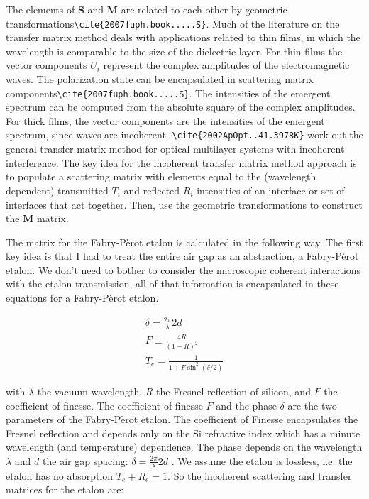 \documentclass[osajnl,preprint,showpacs,superscriptaddress,12pt]{revtex4-1} %
\begin{document}
The elements of $\boldsymbol{S}$ and $\boldsymbol{M}$ are related to each other by geometric transformations\verb|\cite{2007fuph.book.....S}|.  Much of the literature on the transfer matrix method deals with applications related to thin films, in which the wavelength is comparable to the size of the dielectric layer.  For thin films the vector components $U_{i}$ represent the complex amplitudes of the electromagnetic waves.  The polarization state can be encapsulated in scattering matrix components\verb|\cite{2007fuph.book.....S}|.  The intensities of the emergent spectrum can be computed from the absolute square of the complex amplitudes.  For thick films, the vector components are the intensities of the emergent spectrum, since waves are incoherent.  \verb|\cite{2002ApOpt..41.3978K}| work out the general transfer-matrix method for optical multilayer systems with incoherent interference.  The key idea for the incoherent transfer matrix method approach is to populate a scattering matrix with elements equal to the (wavelength dependent) transmitted $T_i$ and reflected $R_i$ intensities of an interface or set of interfaces that act together.  Then, use the geometric transformations to construct the $\boldsymbol{M}$ matrix.  

The matrix for the Fabry-P\`erot etalon is calculated in the following way.  The first key idea is that I had to treat the entire air gap as an abstraction, a Fabry-P\`erot etalon.  We don't need to bother to consider the microscopic coherent interactions with the etalon transmission, all of that information is encapsulated in these equations for a Fabry-P\`erot etalon.

\begin{eqnarray}
 \delta = \frac{2\pi}{\lambda}2d \\
  F \equiv \frac{4R}{(1-R)^2} \\
 T_e = \frac{1}{1+F\sin^2(\delta/2)}  \label{eq:FabPerot}
\end{eqnarray}

with $\lambda$ the vacuum wavelength, $R$ the Fresnel reflection of silicon, and $F$ the coefficient of finesse.  The coefficient of finesse $F$ and the phase $\delta$ are the two parameters of the Fabry-P\`erot etalon.  The coefficient of Finesse encapsulates the Fresnel reflection and depends only on the Si refractive index which has a minute wavelength (and temperature) dependence.  The phase depends on the wavelength $\lambda$ and $d$ the air gap spacing: $\delta=\frac{2\pi}{\lambda}2d$ .  We assume the etalon is lossless, i.e. the etalon has no absorption $T_e+R_e=1$.  So the incoherent scattering and transfer matrices for the etalon are:
\end{document}
